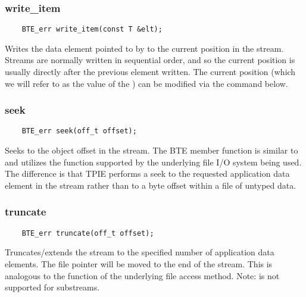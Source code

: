 \subsubsection{write\_item}
\begin{verbatim}
    BTE_err write_item(const T &elt);
\end{verbatim}
Writes the data element pointed to by  to the
current position in the stream. Streams are normally written
in sequential order, and so the current position is usually
directly after the previous element written. The current
position (which we will refer to as the value of the
) can be modified via the 
command below.  


\subsubsection{seek}
\begin{verbatim}
    BTE_err seek(off_t offset);
\end{verbatim}
Seeks to the object offset  in the
stream. The BTE  member function is similar to
and utilizes the  function supported by the
underlying file I/O system being used. The difference is
that TPIE performs a seek to the requested application data
element in the stream rather than to a byte offset within a
file of untyped data. 


\subsubsection{truncate}
\begin{verbatim}
    BTE_err truncate(off_t offset);
\end{verbatim}
Truncates/extends the stream to the specified number of
application data elements. The file
pointer will be moved to
the end of the stream. This is analogous to the
 function of the underlying file access
method. Note:  is not supported for substreams.

